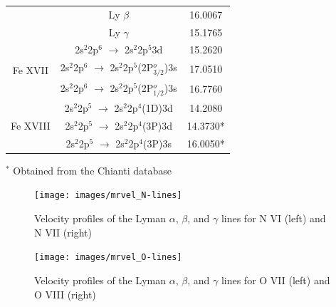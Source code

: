 \begin{table}[h!]
\begin{tabular}{ccc}
                                                  & {Ly $\beta$}  & {16.0067} \\ %
                                                  & {Ly $\gamma$} & {15.1765} \\ \hline
                        \multirow{3}{*}{Fe XVII}  & {2s$^2$2p$^6$ $\longrightarrow$ 2s$^2$2p$^5$3d} & {15.2620} \\ %
                                                  & {2s$^2$2p$^6$ $\longrightarrow$ 2s$^2$2p$^5$(2P$^o_{3/2}$)3s} & {17.0510} \\ %
                                                  & {2s$^2$2p$^6$ $\longrightarrow$ 2s$^2$2p$^5$(2P$^o_{1/2}$)3s} & {16.7760} \\ \hline
                        \multirow{3}{*}{Fe XVIII} & {2s$^2$2p$^5$ $\longrightarrow$ 2s$^2$2p$^4$(1D)3d} & {14.2080} \\ %
                                                  & {2s$^2$2p$^5$ $\longrightarrow$ 2s$^2$2p$^4$(3P)3d} & {14.3730*} \\ %
                                                  & {2s$^2$2p$^5$ $\longrightarrow$ 2s$^2$2p$^4$(3P)3s} & {16.0050*} \\ \hline
                    \end{tabular}
                    \begin{minipage}{16cm}
						\vspace{0.1cm}
						\small $^*$ Obtained from the Chianti database \cite{dere1997chianti}
					\end{minipage}
                \end{table}
                \renewcommand{\arraystretch}{2.2}
                
                \begin{figure}[!htb]
    				\centering
    				\texttt{[image: images/mrvel\_N-lines]}
    				\caption{Velocity profiles of the Lyman $\alpha$, $\beta$, and $\gamma$ lines for N VI (left) and N VII (right)}
    				\label{fig:vel-prof-N}
			    \end{figure}
			    
			    \begin{figure}[!htb]
    				\centering
    				\texttt{[image: images/mrvel\_O-lines]}
    				\caption{Velocity profiles of the Lyman $\alpha$, $\beta$, and $\gamma$ lines for O VII (left) and O VIII (right)}
    				\label{fig:vel-prof-O}
			    \end{figure}
			    
